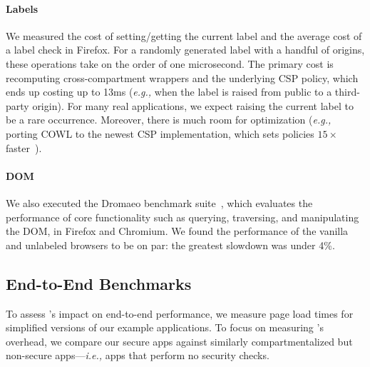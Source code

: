 \paragraph{Labels} We measured the cost of setting/getting the current
label and the average cost of a label check in Firefox.
%
For a randomly generated label with a handful of origins, these
operations take on the order of one microsecond.
%
The primary cost is recomputing cross-compartment wrappers and
the underlying CSP policy, which ends up costing up to 13ms (\emph{e.g.,} when
the label is raised from public to a third-party origin).
%
For many real applications, we expect raising the current label
to be a rare occurrence.
%
Moreover, there is much room for optimization (\emph{e.g.,}
porting COWL to the newest CSP implementation, which sets
policies $15\times$ faster~\cite{faster-csp}).
 
\paragraph{DOM} We also executed the Dromaeo benchmark suite~\cite{dromaeo},
which evaluates the performance of core functionality such as
querying, traversing, and manipulating the DOM, in Firefox and
Chromium. We found the performance of the vanilla and unlabeled
browsers to be on par: the greatest slowdown was under 4\%.

\subsection{End-to-End Benchmarks}
\label{sec:eval:macro}

To assess \sys{}'s impact on end-to-end performance, we measure
page load times for simplified versions of our example applications.
%
To focus on measuring \sys{}'s overhead, we compare our secure apps
against similarly compartmentalized but non-secure apps---\emph{i.e.,}
apps that perform no security checks.
%


